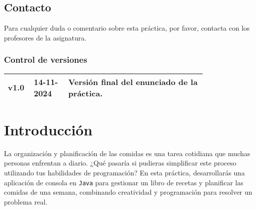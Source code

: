 \documentclass[
    a4paper, %
    12pt, %
]{CSSullivanBusinessReport}
\begin{document}
\begin{twothirdswidth}
    \subsection*{Contacto}
    
    Para cualquier duda o comentario sobre esta práctica, por favor, contacta con los profesores de la asignatura.
    
    \vfill %
    
    \subsubsection*{Control de versiones}
    
    \scriptsize %
    
    \begin{tabular}{@{} L{0.05\linewidth} L{0.15\linewidth} L{0.6\linewidth} @{}} %
        \toprule
        v1.0 & 14-11-2024 & Versión final del enunciado de la práctica.\\
        \bottomrule
    \end{tabular}
\end{twothirdswidth}

\newpage


\begin{twothirdswidth} %
    \tableofcontents %
\end{twothirdswidth}

\newpage


\section{Introducción} %
La organización y planificación de las comidas es una tarea cotidiana que muchas personas enfrentan a diario. ¿Qué pasaría si pudieras simplificar este proceso utilizando tus habilidades de programación? En esta práctica, desarrollarás una aplicación de consola en \texttt{Java} para gestionar un libro de recetas y planificar las comidas de una semana, combinando creatividad y programación para resolver un problema real.
\end{document}
